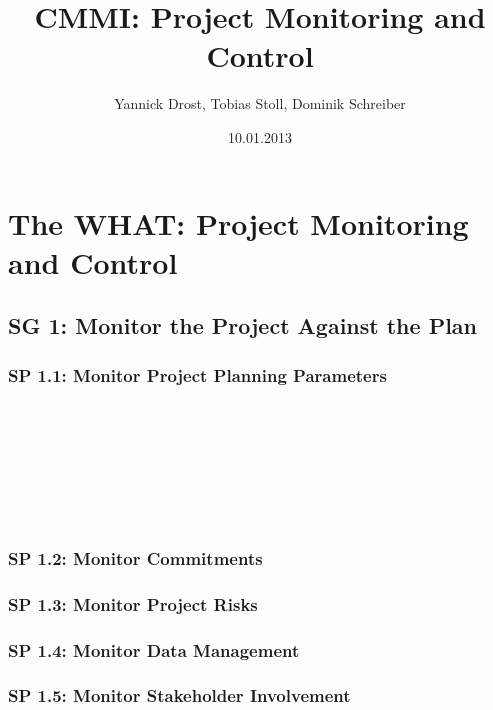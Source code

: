 \documentclass[accentcolor=tud1b]{tudbeamer}
\title{CMMI: Project Monitoring and Control}
\author{Yannick Drost, Tobias Stoll, Dominik Schreiber}
\date{10.01.2013}
\newcommand{\strong}[1]{\textaccentcolor{\textsf{\textbf{#1}}}}
\newenvironment*{tframe}[1][]{%
	\begin{frame}
	\ifnum\Level=2
		\frametitle{\insertsectionhead\\\strong{#1}}
	\fi\ifnum\Level=3
		\frametitle{\insertsectionhead\\\strong{\insertsubsectionhead} \textnormal{#1}}
	\fi\ifnum\Level=4
		\frametitle{\insertsubsectionhead\\\strong{\insertsubsubsectionhead} #1}
	\fi
}{%
	\end{frame}
}
\begin{document}
\begin{titleframe}
\end{titleframe}

\section{The WHAT: Project Monitoring and Control}
\begin{frame}

\cite{cmmi2010cmmidevelopment13}

\end{frame}


\subsection{SG 1: Monitor the Project Against the Plan}

\subsubsection{SP 1.1: Monitor Project Planning Parameters}
\begin{tframe}

\end{tframe}

\subsubsection{SP 1.2: Monitor Commitments}

\subsubsection{SP 1.3: Monitor Project Risks}

\subsubsection{SP 1.4: Monitor Data Management}

\subsubsection{SP 1.5: Monitor Stakeholder Involvement}
\end{document}
